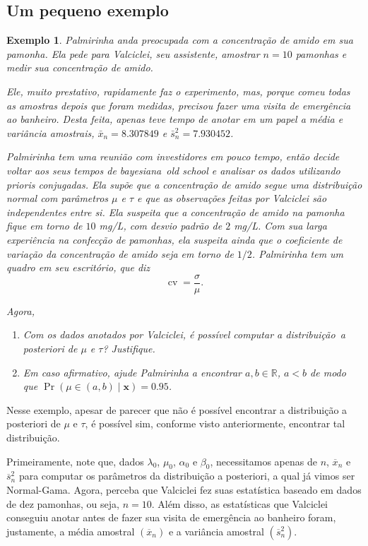 \documentclass{article}
\newtheorem{example}{Exemplo}
\begin{document}
\subsection*{Um pequeno exemplo}

\begin{example}
    Palmirinha anda preocupada com a concentração de amido em sua pamonha. Ela pede para Valciclei, seu assistente, amostrar $n=10$ pamonhas e medir sua concentração de amido.
    
    Ele, muito prestativo, rapidamente faz o experimento, mas, porque comeu todas as amostras depois que foram medidas, precisou fazer uma visita de emergência ao banheiro. Desta feita, apenas teve tempo de anotar em um papel a média e variância amostrais, $\bar{x}_n =  8.307849$ e $\bar{s}^2_n = 7.930452$.
    
    Palmirinha tem uma reunião com investidores em pouco tempo, então decide voltar aos seus tempos de bayesiana~\textit{old school} e analisar os dados utilizando prioris conjugadas. Ela supõe que a concentração de amido segue uma distribuição normal com parâmetros $\mu$ e $\tau$ e que as observações feitas por Valciclei são independentes entre si. Ela suspeita que a concentração de amido na pamonha fique em torno de $10$ mg/L, com desvio padrão de  $2$ mg/L. Com sua larga experiência na confecção de pamonhas, ela suspeita ainda que o coeficiente de variação da concentração de amido seja em torno de $1/2$. Palmirinha tem um quadro em seu escritório, que diz
    \[\operatorname{cv} = \frac{\sigma}{\mu}.\]
    
    Agora, 
    \begin{enumerate}
        \item
            Com os dados anotados por Valciclei, é possível computar a distribuição~\textit{a posteriori} de $\mu$ e $\tau$? Justifique.
            
        \item
            Em caso afirmativo, ajude Palmirinha a encontrar $a, b \in \mathbb{R}$, $a < b$ de modo que $\operatorname{Pr}(\mu \in (a, b) \mid \boldsymbol{x}) = 0.95$.
    \end{enumerate}
\end{example}

Nesse exemplo, apesar de parecer que não é possível encontrar a distribuição a posteriori de $\mu$ e $\tau$, é possível sim, conforme visto anteriormente, encontrar tal distribuição.

Primeiramente, note que, dados $\lambda_0$, $\mu_0$, $\alpha_0$ e $\beta_0$, necessitamos apenas de $n$, $\overline{x}_n$ e $\overline{s}_n^2$ para computar os parâmetros da distribuição a posteriori, a qual já vimos ser Normal-Gama. Agora, perceba que Valciclei fez suas estatística baseado em dados de dez pamonhas, ou seja, $n = 10$. Além disso, as estatísticas que Valciclei conseguiu anotar antes de fazer sua visita de emergência ao banheiro foram, justamente, a média amostral $\left(\overline{x}_n\right)$ e a variância amostral $\left(\overline{s}_n^2\right)$.
\end{document}
